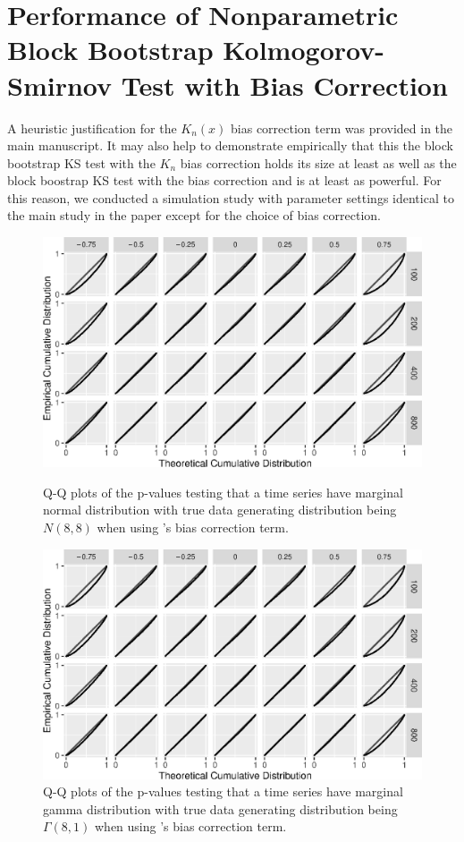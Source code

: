 \documentclass[12pt]{article}
\begin{document}
\section{Performance of Nonparametric
Block Bootstrap Kolmogorov-Smirnov Test with \citet{babu2004goodness} Bias Correction}

A heuristic justification for the $K_n(x)$ bias correction term was provided in the main manuscript. It may also help to demonstrate
empirically that this the block bootstrap KS test with the $K_n$ bias correction holds its size at least as
well as the block boostrap KS test with the \citet{babu2004goodness} bias correction and is at
least as powerful. For this reason, we conducted a simulation study
with parameter settings identical to the main study in the paper except
for the choice of bias correction.

\begin{figure}[tbp]
  \includegraphics[width = .9\textwidth]{figures/normal_C_n}
  \centering
  \vspace{-10pt}
  \caption{Q-Q plots of the p-values testing that a time series
    have marginal normal distribution with true data generating distribution
    being $N(8,8)$ when using \citet{babu2004goodness}'s bias correction term.}
  \label{fig:qq_n_C_n}
    \hspace{3cm}
  \includegraphics[width = .9\textwidth]{figures/gamma_C_n}
  \vspace{-5pt}
  \caption{Q-Q plots of the p-values testing that a time series
    have marginal gamma distribution with true data generating distribution
    being $\Gamma(8,1)$ when using \citet{babu2004goodness}'s bias correction term.}
  \label{fig:qq_g_C_n}
\end{figure}
\end{document}
